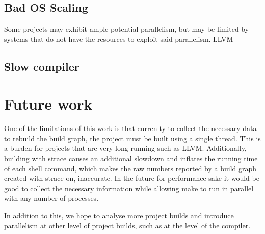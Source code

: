 \documentclass[twocolumn,acmtog,10pt,review]{acmart}
\begin{document}
\subsection{Bad OS Scaling}

Some projects may exhibit ample potential parallelism, but may be limited by systems that do not
have the resources to exploit said parallelism.  LLVM \cite{} 


\subsection{Slow compiler}

\section{Future work}

One of the limitations of this work is that currenlty to collect the necessary data to rebuild
the build graph, the project must be built using a single thread.  This is a burden for projects
that are very long running such as LLVM.  Additionally, building with strace causes an additional
slowdown and inflates the running time of each shell command, which makes the raw numbers
reported by a build graph created with strace on, inaccurate.  In the future for performance sake
it would be good to collect the necessary information while allowing make to run in parallel with
any number of processes.

In addition to this, we hope to analyse more project builds and introduce parallelism at other
level of project builds, such as at the level of the compiler.  
\end{document}
